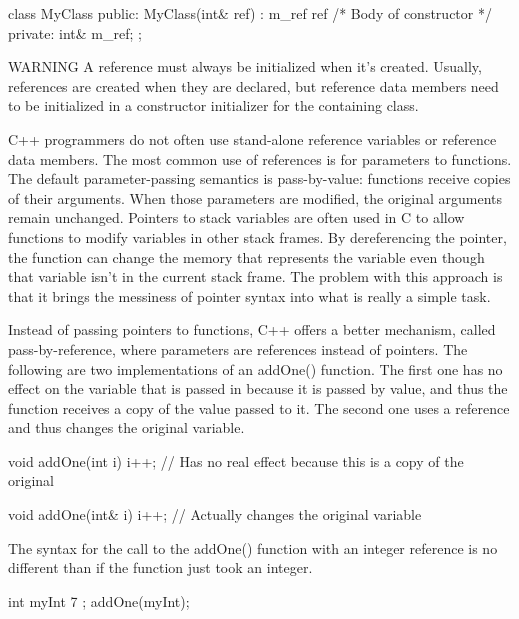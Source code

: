 \begin{cpp}
class MyClass
{
    public:
        MyClass(int& ref) : m_ref { ref } { /* Body of constructor */ }
    private:
        int& m_ref;
};
\end{cpp}

\begin{myWarning}{WARNING}
A reference must always be initialized when it’s created. Usually, references are created when they are declared, but reference data members need to be initialized in a constructor initializer for the containing class.
\end{myWarning}


C++ programmers do not often use stand-alone reference variables or reference data members. The most common use of references is for parameters to functions. The default parameter-passing semantics is pass-by-value: functions receive copies of their arguments. When those parameters are modified, the original arguments remain unchanged. Pointers to stack variables are often used in C to allow functions to modify variables in other stack frames. By dereferencing the pointer, the function can change the memory that represents the variable even though that variable isn’t in the current stack frame. The problem with this approach is that it brings the messiness of pointer syntax into what is really a simple task.

Instead of passing pointers to functions, C++ offers a better mechanism, called pass-by-reference, where parameters are references instead of pointers. The following are two implementations of an addOne() function. The first one has no effect on the variable that is passed in because it is passed by value, and thus the function receives a copy of the value passed to it. The second one uses a reference and thus changes the original variable.

\begin{cpp}
void addOne(int i)
{
    i++; // Has no real effect because this is a copy of the original
}

void addOne(int& i)
{
    i++; // Actually changes the original variable
}
\end{cpp}

The syntax for the call to the addOne() function with an integer reference is no different than if the function just took an integer.

\begin{cpp}
int myInt { 7 };
addOne(myInt);
\end{cpp}

